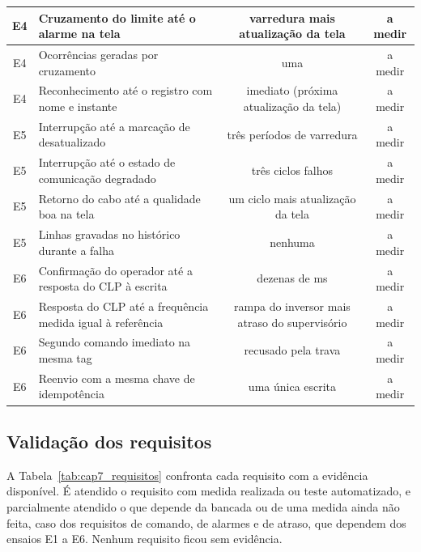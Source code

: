 {\begin{xltabular}{\textwidth}{cXcc}
        \hline
        E4 & Cruzamento do limite até o alarme na tela & varredura mais atualização da tela & a medir \\
        \hline
        E4 & Ocorrências geradas por cruzamento & uma & a medir \\
        \hline
        E4 & Reconhecimento até o registro com nome e instante & imediato (próxima atualização da tela) & a medir \\
        \hline
        E5 & Interrupção até a marcação de desatualizado & três períodos de varredura & a medir \\
        \hline
        E5 & Interrupção até o estado de comunicação degradado & três ciclos falhos & a medir \\
        \hline
        E5 & Retorno do cabo até a qualidade boa na tela & um ciclo mais atualização da tela & a medir \\
        \hline
        E5 & Linhas gravadas no histórico durante a falha & nenhuma & a medir \\
        \hline
        E6 & Confirmação do operador até a resposta do CLP à escrita & dezenas de ms & a medir \\
        \hline
        E6 & Resposta do CLP até a frequência medida igual à referência & rampa do inversor mais atraso do supervisório & a medir \\
        \hline
        E6 & Segundo comando imediato na mesma tag & recusado pela trava & a medir \\
        \hline
        E6 & Reenvio com a mesma chave de idempotência & uma única escrita & a medir \\
        \hline
\end{xltabular}}


\subsection{Validação dos requisitos}

\par A Tabela~\ref{tab:cap7_requisitos} confronta cada requisito com a evidência disponível. É atendido o requisito com medida realizada ou teste automatizado, e parcialmente atendido o que depende da bancada ou de uma medida ainda não feita, caso dos requisitos de comando, de alarmes e de atraso, que dependem dos ensaios E1 a E6. Nenhum requisito ficou sem evidência.

